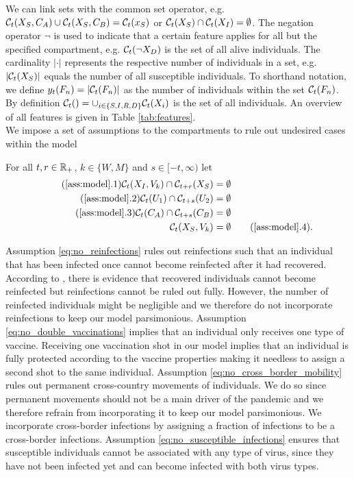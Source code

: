 We can link sets with the common set operator, e.g. $\mathcal{C}_t(X_S, C_A) \cup \mathcal{C}_t(X_S, C_B) = \mathcal{C}_t(x_S)$ or $\mathcal{C}_t(X_S) \cap \mathcal{C}_t(X_I) = \emptyset$. The negation operator $\neg$ is used to indicate that a certain feature applies for all but the specified compartment, e.g. $\mathcal{C}_t(\neg X_D)$ is the set of all alive individuals. The cardinality $|\cdot|$ represents the respective number of individuals in a set, e.g. $|\mathcal{C}_t(X_S)|$ equals the number of all susceptible individuals. To shorthand notation, we define $y_t(F_n) = |\mathcal{C}_t(F_n)|$ as the number of individuals within the set $\mathcal{C}_t(F_n)$. By definition $\mathcal{C}_t() = \cup_{i \in \{ S, I, R,D\}} \mathcal{C}_t(X_i)$ is the set of all individuals. An overview of all features is given in Table \ref{tab:features}. \\


We impose a set of assumptions to the compartments to rule out undesired cases within the model 
\begin{assumption}\label{ass:model}
For all $t,r \in \mathbb{R}_+$, $k \in \{W,M\}$ and $s \in [-t, \infty)$ let
\begin{align*}
\tag{\ref{ass:model}.1} 
\label{eq:no_reinfections}
\set(X_I, V_k) \cap \mathcal{C}_{t+r}(X_S) &= \emptyset \\
\tag{\ref{ass:model}.2} 
\label{eq:no_double_vaccinations}
\set(U_1) \cap \mathcal{C}_{t+s}(U_2) &= \emptyset \\
\tag{\ref{ass:model}.3} 
\label{eq:no_cross_border_mobility}
\set(C_A) \cap \mathcal{C}_{t+s}(C_B) &= \emptyset  \\
\set(X_S, V_k) &= \emptyset
\tag{\ref{ass:model}.4}.
\label{eq:no_susceptible_infections}
\end{align*}
\end{assumption}
\noindent Assumption \ref{eq:no_reinfections} rules out reinfections such that an individual that has been infected once cannot become reinfected after it had recovered. According to \cite{Roy.2020}, there is evidence that recovered individuals cannot become reinfected but reinfections cannot be ruled out fully. However, the number of reinfected individuals might be negligible and we therefore do not incorporate reinfections to keep our model parsimonious. Assumption \ref{eq:no_double_vaccinations} implies that an individual only receives one type of vaccine. Receiving one vaccination shot in our model implies that an individual is fully protected according to the vaccine properties making it needless to assign a second shot to the same individual. Assumption \ref{eq:no_cross_border_mobility} rules out permanent cross-country movements of individuals. We do so since  permanent movements should not be a main driver of the pandemic and we therefore refrain from incorporating it to keep our model parsimonious. We incorporate cross-border infections by assigning a fraction of infections to be a cross-border infections.
Assumption \ref{eq:no_susceptible_infections} ensures that susceptible individuals cannot be associated with any type of virus, since they have not been infected yet and can become infected with both virus types.


